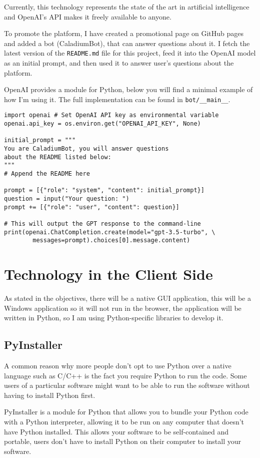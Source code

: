 Currently, this technology represents the state of the art in
artificial intelligence and
OpenAI's API makes it freely available to anyone.

To promote the platform, I have created a promotional page on
GitHub pages and added a bot (CaladiumBot),
that can answer questions about it.
I fetch the latest version of the \texttt{README.md} file for
this project, feed it into the OpenAI model as an initial prompt,
and then used it to answer user's questions about the platform.

OpenAI provides a module for Python,
below you will find a minimal example of how I'm using it.
The full implementation can be found in \texttt{bot/\_\_main\_\_}.

\begin{lstlisting}
import openai # Set OpenAI API key as environmental variable
openai.api_key = os.environ.get("OPENAI_API_KEY", None)

initial_prompt = """
You are CaladiumBot, you will answer questions
about the README listed below:
"""
# Append the README here

prompt = [{"role": "system", "content": initial_prompt}]
question = input("Your question: ")
prompt += [{"role": "user", "content": question}]

# This will output the GPT response to the command-line
print(openai.ChatCompletion.create(model="gpt-3.5-turbo", \
        messages=prompt).choices[0].message.content)
\end{lstlisting}

\section{Technology in the Client Side}
As stated in the objectives, there will be a native GUI application,
this will be a Windows application so it will not run in the browser,
the application will be written in Python,
so I am using Python-specific libraries to develop it.

\subsection{PyInstaller}
A common reason why more people don't opt to use Python over a
native language such as C/C++ is the fact you require Python
to run the code.
Some users of a particular software might
want to be able to run the software without having to install Python first.

PyInstaller is a module for Python that allows you to bundle your
Python code with a Python interpreter, allowing it to be run on any computer
that doesn't have Python installed.
This allows your software to be self-contained and portable,
users don't have to install Python on their computer to install your software.

